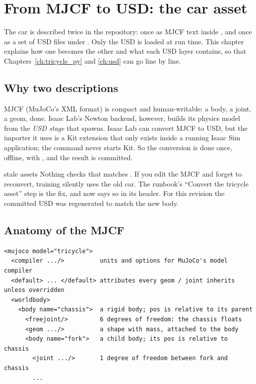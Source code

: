 \chapter{From MJCF to USD: the car asset}
\label{ch:asset}

The car is described twice in the repository: once as MJCF text inside
, and once as a set of USD files under
. Only the USD is loaded at run time. This chapter
explains how one becomes the other and what each USD layer contains, so that
Chapters~\ref{ch:tricycle_py} and \ref{ch:usd} can go line by line.

\section{Why two descriptions}

MJCF (MuJoCo's XML format) is compact and human-writable: a body, a joint, a
geom, done. Isaac Lab's Newton backend, however, builds its physics model from
the \emph{USD stage} that  spawns. Isaac Lab can convert
MJCF to USD, but the importer it uses is a Kit extension that only exists
inside a running Isaac Sim application; the  command never
starts Kit. So the conversion is done once, offline, with
, and the result is committed.

\begin{warnbox}{stale assets}
Nothing checks that  matches . If
you edit the MJCF and forget to reconvert, training silently uses the old car.
The runbook's ``Convert the tricycle asset'' step is the fix, and
 now says so in its header. For this revision the committed
USD was regenerated to match the new body.
\end{warnbox}

\section{Anatomy of the MJCF}

\begin{lstlisting}[style=plain,numbers=none]
<mujoco model="tricycle">
  <compiler .../>          units and options for MuJoCo's model compiler
  <default> ... </default> attributes every geom / joint inherits unless overridden
  <worldbody>
    <body name="chassis">  a rigid body; pos is relative to its parent
      <freejoint/>         6 degrees of freedom: the chassis floats
      <geom .../>          a shape with mass, attached to the body
      <body name="fork">   a child body; its pos is relative to chassis
        <joint .../>       1 degree of freedom between fork and chassis
        ...
\end{lstlisting}

